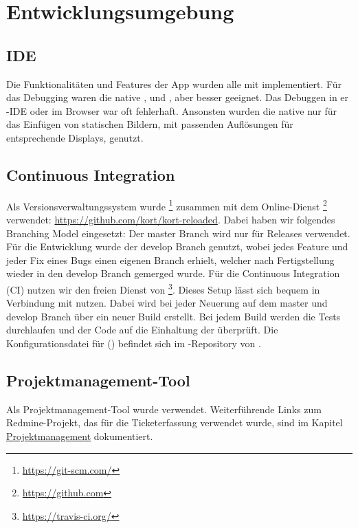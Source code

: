 \chapter{Entwicklungsumgebung}
\label{pd-entwicklungsumgebung}
\section{IDE}
Die Funktionalitäten und Features der App wurden alle mit  implementiert. 
Für das Debugging waren die native ,  und , aber besser geeignet. 
Das Debuggen in er -\gls{IDE} oder im  Browser war oft fehlerhaft. 
Ansonsten wurden die native  nur für das Einfügen von statischen Bildern, mit passenden Auflösungen für entsprechende Displays, genutzt. 


\section{Continuous Integration}
Als Versionsverwaltungssystem wurde \footnote{\url{https://git-scm.com/}} zusammen mit dem Online-Dienst \footnote{\url{https://github.com}} verwendet: \url{https://github.com/kort/kort-reloaded}.
Dabei haben wir folgendes Branching Model eingesetzt: Der master Branch wird nur für Releases verwendet.
Für die Entwicklung wurde der develop Branch genutzt, wobei jedes Feature und jeder Fix eines Bugs einen eigenen Branch erhielt, welcher nach Fertigstellung wieder in den develop Branch gemerged wurde.\newline
\newline
Für die Continuous Integration (\gls{CI}) nutzen wir den freien Dienst von \footnote{\url{https://travis-ci.org/}}.
Dieses Setup lässt sich bequem in Verbindung mit  nutzen. 
Dabei wird bei jeder Neuerung auf dem master und develop Branch über  ein neuer Build erstellt.
Bei jedem Build werden die Tests durchlaufen und der Code auf die Einhaltung der  überprüft.\newline
Die Konfigurationsdatei für  () befindet sich im -Repository von \kort{}.

\section{Projektmanagement-Tool}
Als Projektmanagement-Tool wurde  verwendet. 
Weiterführende Links zum Redmine-Projekt, das für die Ticketerfassung verwendet wurde, sind im Kapitel \hyperref[pm-projektmanagement]{Projektmanagement} dokumentiert.


